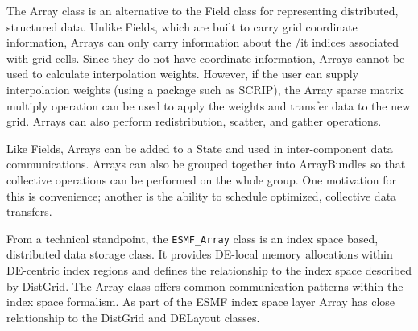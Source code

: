 
The Array class is an alternative to the Field class for representing distributed, structured data.  Unlike Fields, which are built to carry grid coordinate information, Arrays can only carry information about the {/it indices} associated with grid cells.  Since they do not have coordinate information, Arrays cannot be used to calculate interpolation weights.  However, if the user can supply interpolation weights (using a package such as SCRIP), the Array sparse matrix multiply operation can be used to apply the weights and transfer data to the new grid.  Arrays can also perform redistribution, scatter, and gather operations.

Like Fields, Arrays can be added to a State and used in inter-component data communications.  Arrays can also be grouped together into ArrayBundles so that collective operations can be performed on the whole group.  One motivation for this is convenience; another is the ability to schedule optimized, collective data transfers.   

From a technical standpoint, the {\tt ESMF\_Array} class is an index space based, distributed data storage class. It provides DE-local memory allocations within DE-centric index regions and defines the relationship to the index space described by DistGrid. The Array class offers common communication patterns within the index space formalism. As part of the ESMF index space layer Array has close relationship to the DistGrid and DELayout classes.
